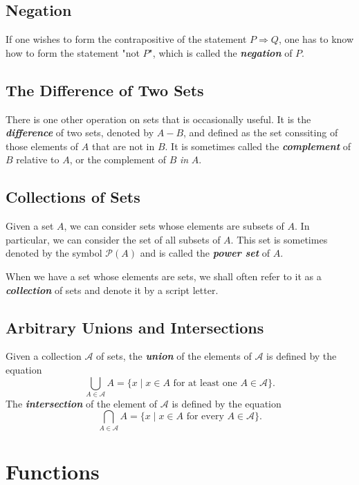 \documentclass[a4paper,12pt,twoside,openany]{book}
\begin{document}
\subsection{Negation}

If one wishes to form the contrapositive of the statement $P\Rightarrow Q$, one has to know how to form the statement "not $P$", which is called the \textit{\textbf{negation}} of $P$.

\subsection{The Difference of Two Sets}

There is one other operation on sets that is occasionally useful. It is the \textit{\textbf{difference}} of two sets, denoted by $A-B$, and defined as the set conssiting of those elements of $A$ that are not in $B$. It is sometimes called the \textit{\textbf{complement}} of $B$ relative to $A$, or the complement of $B$ \textit{in} $A$.

\subsection{Collections of Sets}

Given a set $A$, we can consider sets whose elements are subsets of $A$. In particular, we can consider the set of all subsets of $A$. This set is sometimes denoted by the symbol $\mathcal{P}(A)$ and is called the \textit{\textbf{power set}} of $A$.

When we have a set whose elements are sets, we shall often refer to it as a \textit{\textbf{collection}} of sets and denote it by a script letter.

\subsection{Arbitrary Unions and Intersections}

Given a collection $\mathcal{A}$ of sets, the \textit{\textbf{union}} of the elements of $\mathcal{A}$ is defined by the equation $$\bigcup_{A\in \mathcal{A}}A=\{x\mid x\in A\text{ for at least one }A\in\mathcal{A}\}.$$ The \textit{\textbf{intersection}} of the element of $\mathcal{A}$ is defined by the equation $$\bigcap_{A\in\mathcal{A}}A=\{x\mid x\in A\text{ for every }A\in\mathcal{A}\}.$$

\section{Functions}
\end{document}
